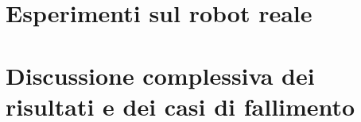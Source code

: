 \section{Esperimenti sul robot reale}
\label{sec:esperimenti-reale}

\section{Discussione complessiva dei risultati e dei casi di fallimento}
\label{sec:esperimenti-discussione}

